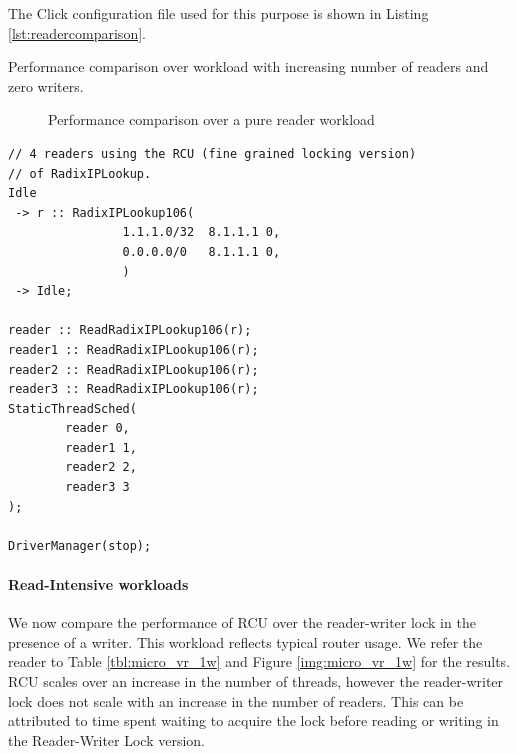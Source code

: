 \documentclass{article}
\begin{document}
The Click configuration file used for this purpose is shown in Listing \ref{lst:readercomparison}.
\begin{table}
\begin{center}

\end{center}
\label{tbl:micro_vr_0w}
\caption{Performance comparison over workload with increasing number of readers and zero writers.}
\end{table}

\begin{figure}[tph]
\caption{Performance comparison over a pure reader workload}
\label{img:micro_vr_0w}
\end{figure}

\begin{lstlisting}[float=tph, caption = A Click configuration file for 4 readers, label =lst:readercomparison]
// 4 readers using the RCU (fine grained locking version)
// of RadixIPLookup.
Idle
 -> r :: RadixIPLookup106(
                1.1.1.0/32  8.1.1.1 0,
                0.0.0.0/0   8.1.1.1 0,
                ) 
 -> Idle;

reader :: ReadRadixIPLookup106(r);
reader1 :: ReadRadixIPLookup106(r);
reader2 :: ReadRadixIPLookup106(r);
reader3 :: ReadRadixIPLookup106(r);
StaticThreadSched(
        reader 0,
        reader1 1,
        reader2 2,
        reader3 3
);

DriverManager(stop);

\end{lstlisting}

\paragraph{Read-Intensive workloads}
We now compare the performance of RCU over the reader-writer lock in the presence of a writer. This workload reflects typical router usage. We refer the reader to Table \ref{tbl:micro_vr_1w} and Figure \ref{img:micro_vr_1w} for the results.
RCU scales over an increase in the number of threads, however the reader-writer lock does not scale with an increase in the number of readers. This can be attributed to time spent waiting to acquire the lock before reading or writing in the Reader-Writer Lock version.
\end{document}
